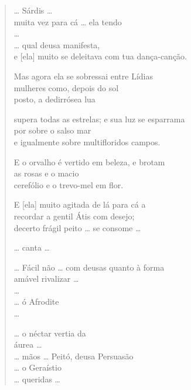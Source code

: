 \vspace{-1em}
\begin{verse}
\ldots{} Sárdis \ldots{}\\
muita vez para cá \ldots{} ela tendo\\
\ldots{}\\
\ldots{} qual deusa manifesta,\\
e [ela] muito se deleitava com tua dança-canção.\\

\medskip

Mas agora ela se sobressai entre Lídias\\
mulheres como, depois do sol\\
posto, a dedirrósea lua\\

\medskip

supera todas as estrelas; e sua luz se esparrama\\
por sobre o salso mar \\
e igualmente sobre multifloridos campos.\\

\medskip

E o orvalho é vertido em beleza, e brotam\\
as rosas e o macio \\
cerefólio e o trevo-mel em flor.\\

\medskip

E [ela] muito agitada de lá para cá a \\
recordar a gentil Átis com desejo;\\
decerto frágil peito \ldots{} se consome \ldots{}\\

\medskip

\ldots{} canta \ldots{}\\

\medskip

\ldots{} Fácil não \ldots{} com deusas quanto à forma\\
amável rivalizar \ldots{}\\
\ldots{}\\
\ldots{} ó Afrodite\\
\ldots{}\\

\medskip

\ldots{} o néctar vertia da\\
áurea \ldots{}\\
\ldots{} mãos \ldots{} Peitó, deusa Persuasão\\
\ldots{} o Geraístio\\
\ldots{} queridas \ldots{}
\end{verse}

